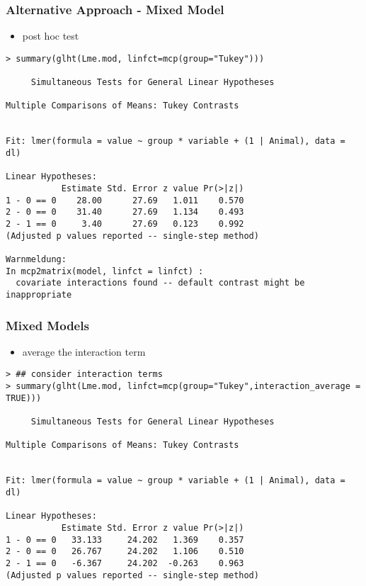 \begin{frame}\frametitle{Alternative Approach - Mixed Model}
  \begin{itemize}
  \item post hoc test
  \end{itemize}
  \scriptsize
\begin{verbatim}
> summary(glht(Lme.mod, linfct=mcp(group="Tukey")))

	 Simultaneous Tests for General Linear Hypotheses

Multiple Comparisons of Means: Tukey Contrasts


Fit: lmer(formula = value ~ group * variable + (1 | Animal), data = dl)

Linear Hypotheses:
           Estimate Std. Error z value Pr(>|z|)
1 - 0 == 0    28.00      27.69   1.011    0.570
2 - 0 == 0    31.40      27.69   1.134    0.493
2 - 1 == 0     3.40      27.69   0.123    0.992
(Adjusted p values reported -- single-step method)

Warnmeldung:
In mcp2matrix(model, linfct = linfct) :
  covariate interactions found -- default contrast might be inappropriate
\end{verbatim}
\end{frame}

\begin{frame}\frametitle{Mixed Models}
  \begin{itemize}
  \item average the interaction term
  \end{itemize}
\scriptsize
\begin{verbatim}
> ## consider interaction terms
> summary(glht(Lme.mod, linfct=mcp(group="Tukey",interaction_average = TRUE)))

	 Simultaneous Tests for General Linear Hypotheses

Multiple Comparisons of Means: Tukey Contrasts


Fit: lmer(formula = value ~ group * variable + (1 | Animal), data = dl)

Linear Hypotheses:
           Estimate Std. Error z value Pr(>|z|)
1 - 0 == 0   33.133     24.202   1.369    0.357
2 - 0 == 0   26.767     24.202   1.106    0.510
2 - 1 == 0   -6.367     24.202  -0.263    0.963
(Adjusted p values reported -- single-step method)
\end{verbatim}
\end{frame}


